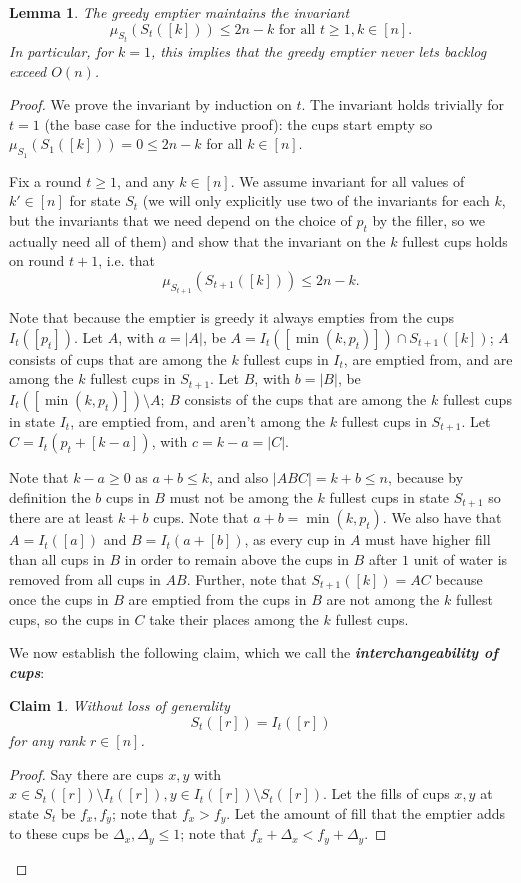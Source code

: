 \documentclass[twocolumn]{article}[10pt]
\newcommand{\defn}[1]{{\textit{\textbf{\boldmath #1}}}\xspace}
\newtheorem{clm}{Claim}
\newtheorem{lemma}{Lemma}
\begin{document}
\begin{lemma}
  The greedy emptier maintains the invariant $$\mu_{S_t}(S_t([k])) \le 2n-k
  \text{ for all } t\ge 1, k \in [n].$$ In particular, for $k=1$, this
  implies that the greedy emptier never lets backlog exceed $O(n)$.
\end{lemma}
\begin{proof}

We prove the invariant by induction on $t$.
The invariant holds trivially for $t=1$ (the base case for the inductive proof): 
the cups start empty so $\mu_{S_1}(S_1([k])) = 0 \le 2n-k$ for all $k \in [n]$.

Fix a round $t \ge 1$, and any $k \in [n]$. We assume invariant for all
values of $k' \in[n]$ for state $S_t$ (we will only explicitly use two of the
invariants for each $k$, but the invariants that we need depend on the
choice of $p_t$ by the filler, so we actually need all of them) and show that
the invariant on the $k$ fullest cups holds on round $t+1$, i.e. that
$$\mu_{S_{t+1}}(S_{t+1}([k])) \le 2n-k.$$

Note that because the emptier is greedy it always empties from the cups $I_t([p_t])$.
Let $A$, with $a=|A|$, be $A = I_t([\min(k, p_t)]) \cap S_{t+1}([k])$; $A$
consists of cups that are among the $k$ fullest cups in $I_t$, are emptied from, and
are among the $k$ fullest cups in $S_{t+1}$.
Let $B$, with $b=|B|$, be $I_t([\min(k, p_t)]) \setminus A$; $B$ consists of
the cups that are among the $k$ fullest cups in state $I_t$, are emptied from,
and aren't among the $k$ fullest cups in $S_{t+1}$. 
Let $C = I_t(p_t+[k-a])$, with $c=k-a = |C|$.

Note that $k-a\ge 0$ as $a+b \le k$, and also $|ABC| = k+b \le n$, because by
definition the $b$ cups in $B$ must not be among the $k$ fullest cups in state
$S_{t+1}$ so there are at least $k+b$ cups. 
Note that $a+ b = \min(k, p_t)$. We also have that $A = I_t([a])$ and $B =
I_t(a+[b])$, as every cup in $A$ must have higher fill than all cups in $B$ in
order to remain above the cups in $B$ after $1$ unit of water is removed from
all cups in $AB$.
Further, note that $S_{t+1}([k]) = AC$ because once the cups in $B$
are emptied from the cups in $B$ are not among the $k$ fullest cups, so the
cups in $C$ take their places among the $k$ fullest cups.

We now establish the following claim, which we call the \defn{interchangeability of cups}:
\begin{clm}
  \label{clm:interchangable}
  Without loss of generality $$S_t([r]) = I_t([r])$$ for any rank $r \in [n]$.
\end{clm}
\begin{proof}
  Say there are cups $x, y$ with $x\in S_t([r]) \setminus I_t([r]), y \in
  I_t([r])\setminus S_t([r])$. Let the fills of cups $x,y$ at state $S_t$
  be $f_x, f_y$; note that $f_x > f_y$. Let the amount of fill that the emptier
  adds to these cups be $\Delta_x, \Delta_y \le 1$; note that $f_x +\Delta_x <
  f_y + \Delta_y$.


\end{proof}
\end{proof}
\end{document}
